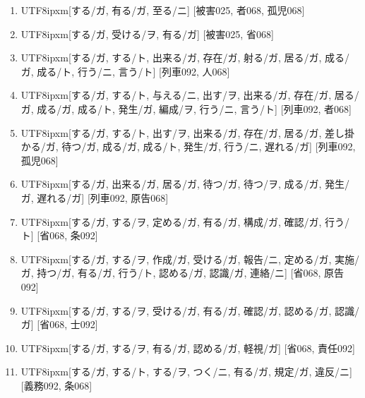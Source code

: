 \begin{enumerate}
\item \begin{CJK}{UTF8}{ipxm}[する/ガ, 有る/ガ, 至る/ニ] [被害025, 者068, 孤児068]\end{CJK}
\item \begin{CJK}{UTF8}{ipxm}[する/ガ, 受ける/ヲ, 有る/ガ] [被害025, 省068]\end{CJK}
\item \begin{CJK}{UTF8}{ipxm}[する/ガ, する/ト, 出来る/ガ, 存在/ガ, 射る/ガ, 居る/ガ, 成る/ガ, 成る/ト, 行う/ニ, 言う/ト] [列車092, 人068]\end{CJK}
\item \begin{CJK}{UTF8}{ipxm}[する/ガ, する/ト, 与える/ニ, 出す/ヲ, 出来る/ガ, 存在/ガ, 居る/ガ, 成る/ガ, 成る/ト, 発生/ガ, 編成/ヲ, 行う/ニ, 言う/ト] [列車092, 者068]\end{CJK}
\item \begin{CJK}{UTF8}{ipxm}[する/ガ, する/ト, 出す/ヲ, 出来る/ガ, 存在/ガ, 居る/ガ, 差し掛かる/ガ, 待つ/ガ, 成る/ガ, 成る/ト, 発生/ガ, 行う/ニ, 遅れる/ガ] [列車092, 孤児068]\end{CJK}
\item \begin{CJK}{UTF8}{ipxm}[する/ガ, 出来る/ガ, 居る/ガ, 待つ/ガ, 待つ/ヲ, 成る/ガ, 発生/ガ, 遅れる/ガ] [列車092, 原告068]\end{CJK}
\item \begin{CJK}{UTF8}{ipxm}[する/ガ, する/ヲ, 定める/ガ, 有る/ガ, 構成/ガ, 確認/ガ, 行う/ト] [省068, 条092]\end{CJK}
\item \begin{CJK}{UTF8}{ipxm}[する/ガ, する/ヲ, 作成/ガ, 受ける/ガ, 報告/ニ, 定める/ガ, 実施/ガ, 持つ/ガ, 有る/ガ, 行う/ト, 認める/ガ, 認識/ガ, 連絡/ニ] [省068, 原告092]\end{CJK}
\item \begin{CJK}{UTF8}{ipxm}[する/ガ, する/ヲ, 受ける/ガ, 有る/ガ, 確認/ガ, 認める/ガ, 認識/ガ] [省068, 士092]\end{CJK}
\item \begin{CJK}{UTF8}{ipxm}[する/ガ, する/ヲ, 有る/ガ, 認める/ガ, 軽視/ガ] [省068, 責任092]\end{CJK}
\item \begin{CJK}{UTF8}{ipxm}[する/ガ, する/ト, する/ヲ, つく/ニ, 有る/ガ, 規定/ガ, 違反/ニ] [義務092, 条068]\end{CJK}

\end{enumerate}
